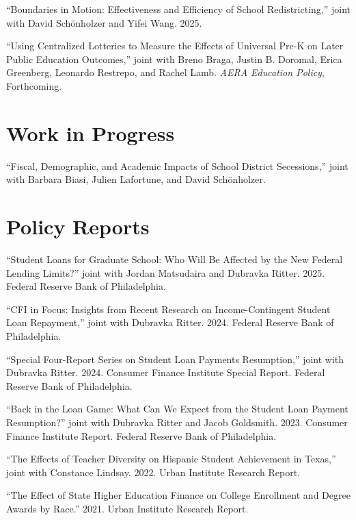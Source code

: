 \documentclass[11pt,letterpaper]{article}
\begin{document}
``Boundaries in Motion: Effectiveness and Efficiency of School Redistricting,'' joint with David Sch\"onholzer and Yifei Wang. 2025.

\medskip

``Using Centralized Lotteries to Measure the Effects of Universal Pre-K on Later Public Education Outcomes,'' joint with Breno Braga, Justin B. Doromal, Erica Greenberg, Leonardo Restrepo, and Rachel Lamb. \textit{AERA Education Policy}, Forthcoming.

\section*{Work in Progress}

``Fiscal, Demographic, and Academic Impacts of School District Secessions,'' joint with Barbara Biasi, Julien Lafortune, and David Sch\"onholzer.

\section*{Policy Reports}

``Student Loans for Graduate School: Who Will Be Affected by the New Federal Lending Limits?'' joint with Jordan Matsudaira and Dubravka Ritter. 2025. Federal Reserve Bank of Philadelphia.

\medskip

``CFI in Focus: Insights from Recent Research on Income-Contingent Student Loan Repayment,'' joint with Dubravka Ritter. 2024. Federal Reserve Bank of Philadelphia.

\medskip

``Special Four-Report Series on Student Loan Payments Resumption,'' joint with Dubravka Ritter. 2024. Consumer Finance Institute Special Report. Federal Reserve Bank of Philadelphia.

\medskip

``Back in the Loan Game: What Can We Expect from the Student Loan Payment Resumption?'' joint with Dubravka Ritter and Jacob Goldsmith. 2023. Consumer Finance Institute Report. Federal Reserve Bank of Philadelphia.

\medskip

``The Effects of Teacher Diversity on Hispanic Student Achievement in Texas,'' joint with Constance Lindsay. 2022. Urban Institute Research Report.

\medskip

``The Effect of State Higher Education Finance on College Enrollment and Degree Awards by Race.'' 2021. Urban Institute Research Report.
\end{document}
